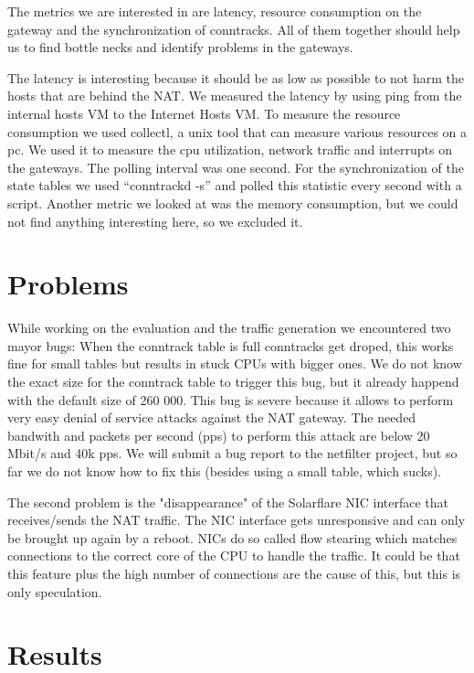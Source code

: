 \documentclass{report}
\begin{document}
The metrics we are interested in are latency, resource consumption on
the gateway and the synchronization of conntracks. All of them together
should help us to find bottle necks and identify problems in the
gateways.

The latency is interesting because it should be as low as possible to
not harm the hosts that are behind the NAT. We measured the latency by
using ping\cite{ping} from the internal hosts VM to the Internet Hosts VM.
To measure the resource consumption we used collectl\cite{collectl}, a unix tool that
can measure various resources on a pc. We used it to measure the cpu
utilization, network traffic and interrupts on the gateways. The polling
interval was one second. For the synchronization of the state tables we
used ``conntrackd -s'' and polled this statistic every second with a
script. Another metric we looked at was the memory consumption, but we
could not find anything interesting here, so we excluded it.


\section{Problems}
While working on the evaluation and the traffic generation we encountered two mayor bugs: 
When the conntrack table is full conntracks get droped, this works fine for small tables 
but results in stuck CPUs with bigger ones. We do not know the exact size for the conntrack
table to trigger this bug, but it already  happend with the default size of 260 000. This bug 
is severe because it allows to perform very easy denial of service attacks against the NAT 
gateway. The needed bandwith and packets per second (pps) to perform this attack are below
20 Mbit/s and 40k pps. We will submit a bug report to the netfilter project, but so far we do
not know how to fix this (besides using a small table, which sucks). 

The second problem is the "disappearance" of the Solarflare NIC interface that receives/sends the 
NAT traffic. The NIC interface gets unresponsive and can only be brought up again by a reboot. NICs 
do so called flow stearing which matches connections to the correct core of the CPU to handle the traffic.
It could be that this feature plus the high number of connections are the cause of this, but this is only
speculation. 

\section{Results}\label{results}
\end{document}
